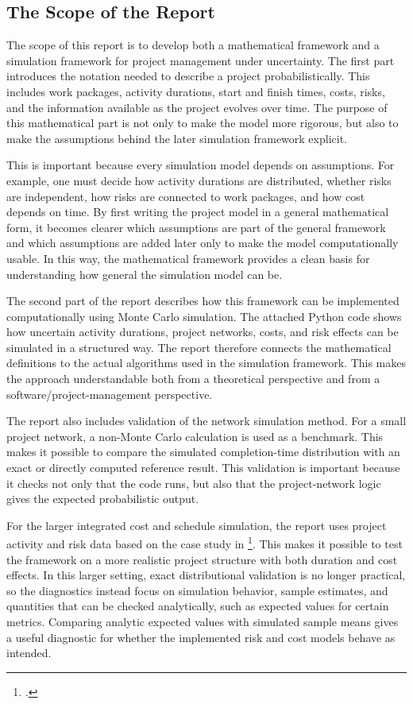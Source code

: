 \documentclass[11pt,a4paper]{article}
\newcommand{\1}{\mathbf{1}}
\theoremstyle{definition}
\theoremstyle{plain}
\theoremstyle{remark}
\numberwithin{equation}{section}
\begin{document}
\subsection{The Scope of the Report}

The scope of this report is to develop both a mathematical framework and a simulation framework for project management under uncertainty. The first part introduces the notation needed to describe a project probabilistically. This includes work packages, activity durations, start and finish times, costs, risks, and the information available as the project evolves over time. The purpose of this mathematical part is not only to make the model more rigorous, but also to make the assumptions behind the later simulation framework explicit.

This is important because every simulation model depends on assumptions. For example, one must decide how activity durations are distributed, whether risks are independent, how risks are connected to work packages, and how cost depends on time. By first writing the project model in a general mathematical form, it becomes clearer which assumptions are part of the general framework and which assumptions are added later only to make the model computationally usable. In this way, the mathematical framework provides a clean basis for understanding how general the simulation model can be.

The second part of the report describes how this framework can be implemented computationally using Monte Carlo simulation. The attached Python code shows how uncertain activity durations, project networks, costs, and risk effects can be simulated in a structured way. The report therefore connects the mathematical definitions to the actual algorithms used in the simulation framework. This makes the approach understandable both from a theoretical perspective and from a software/project-management perspective.

The report also includes validation of the network simulation method. For a small project network, a non-Monte Carlo calculation is used as a benchmark. This makes it possible to compare the simulated completion-time distribution with an exact or directly computed reference result. This validation is important because it checks not only that the code runs, but also that the project-network logic gives the expected probabilistic output.

For the larger integrated cost and schedule simulation, the report uses project activity and risk data based on the case study in \footcite{acebes2024beyondProbabilityImpactMatrices}. This makes it possible to test the framework on a more realistic project structure with both duration and cost effects. In this larger setting, exact distributional validation is no longer practical, so the diagnostics instead focus on simulation behavior, sample estimates, and quantities that can be checked analytically, such as expected values for certain metrics. Comparing analytic expected values with simulated sample means gives a useful diagnostic for whether the implemented risk and cost models behave as intended.
\end{document}
